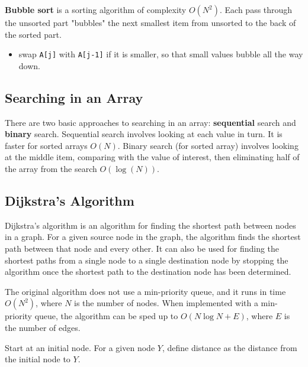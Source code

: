 \textbf{Bubble sort} is a sorting algorithm of complexity $O(N^{2})$. Each pass through the unsorted part "bubbles" the next smallest item from unsorted to the back of the sorted part. 

\begin{itemize}
	\item swap \texttt{A[j]} with \texttt{A[j-1]} if it is smaller, so that small values bubble all the way down. 
\end{itemize}


\subsection{Searching in an Array}

There are two basic approaches to searching in an array: \textbf{sequential} search and \textbf{binary} search. Sequential search involves looking at each value in turn. It is faster for sorted arrays $O(N)$. Binary search (for sorted array) involves looking at the middle item, comparing with the value of interest, then eliminating half of the array from the search $O(\log(N))$. 


\subsection{Dijkstra's Algorithm}

Dijkstra's algorithm is an algorithm for finding the shortest path between nodes in a graph. For a given source node in the graph, the algorithm finds the shortest path between that node and every other. It can also be used for finding the shortest paths from a single node to a single destination node by stopping the algorithm once the shortest path to the destination node has been determined. 

The original algorithm does not use a min-priority queue, and it runs in time $O(N^{2})$, where $N$ is the number of nodes. When implemented with a min-priority queue, the algorithm can be sped up to $O(N \log N + E)$, where $E$ is the number of edges. 

Start at an initial node. For a given node $Y$, define distance as the distance from the initial node to $Y$. 

